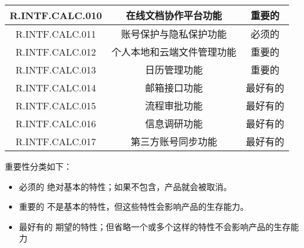 \begin{table}[htbp]
\begin{tabular}{|c|c|c|}
                \hline%
                R.INTF.CALC.010      & 在线文档协作平台功能       & 重要的 \\
                \hline%
                R.INTF.CALC.011      & 账号保护与隐私保护功能      & 必须的 \\
                \hline%
                R.INTF.CALC.012      & 个人本地和云端文件管理功能  & 重要的 \\
                \hline%
                R.INTF.CALC.013      & 日历管理功能              & 重要的 \\
                \hline%
                R.INTF.CALC.014      & 邮箱接口功能              & 最好有的 \\
                \hline%
                    \color{red}R.INTF.CALC.015      
                &   \color{red}流程审批功能              
                &   \color{red}最好有的 \\
                \hline%
                    \color{red}R.INTF.CALC.016      
                &   \color{red}信息调研功能              
                &   \color{red}最好有的 \\
                \hline%
                    \color{red}R.INTF.CALC.017      
                &   \color{red}第三方账号同步功能        
                &   \color{red}最好有的 \\
                \hline%
                
        \end{tabular}
    \end{table}
重要性分类如下：
\begin{itemize}
\item 必须的		绝对基本的特性；如果不包含，产品就会被取消。
\item 重要的		不是基本的特性，但这些特性会影响产品的生存能力。
\item 最好有的		期望的特性；但省略一个或多个这样的特性不会影响产品的生存能力
\end{itemize}
